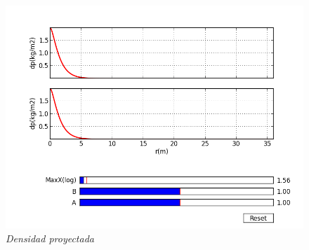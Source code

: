 \documentclass[12pt]{book}
\begin{document}
\begin{itemize}
\begin{figure}[!ht]
 \centering
 \includegraphics[scale=0.33]{pt_dp_compAn.png}
 \caption{\emph{Densidad proyectada}}
\end{figure}

\end{itemize}
\end{document}

